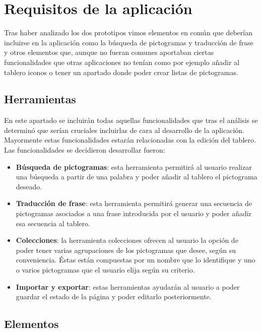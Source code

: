 \section{Requisitos de la aplicación}

Tras haber analizado los dos prototipos vimos elementos en común que deberían incluirse en la aplicación como la búsqueda de pictogramas y traducción de frase y otros elementos que, aunque no fueran comunes aportaban ciertas funcionalidades que otras aplicaciones no tenían como por ejemplo añadir al tablero iconos o tener un apartado donde poder crear listas de pictogramas.

\subsection{Herramientas}

En este apartado se incluirán todas aquellas funcionalidades que tras el análisis se determinó que serían cruciales incluirlas de cara al desarrollo de la aplicación. Mayormente estas funcionalidades estarán relacionadas con la edición del tablero. Las funcionalidades se decidieron desarrollar fueron:

\begin{itemize}
	\item \textbf{Búsqueda de pictogramas}: esta herramienta permitirá al usuario realizar una búsqueda a partir de una palabra y poder añadir al tablero el pictograma deseado.
	
	\item \textbf{Traducción de frase}: esta herramienta permitirá generar una secuencia de pictogramas asociados a una frase introducida por el usuario y poder añadir esa secuencia al tablero.
	
	\item \textbf{Colecciones}: la herramienta colecciones ofrecen al usuario la opción de poder tener varias agrupaciones de los pictogramas que desee, según su conveniencia. Éstas están compuestas por un nombre que lo identifique y uno o varios pictogramas que el usuario elija según su criterio.
	
	\item \textbf{Importar y exportar}: estas herramientas ayudarán al usuario a poder guardar el estado de la página y poder editarlo posteriormente. 
\end{itemize}


\subsection{Elementos}


